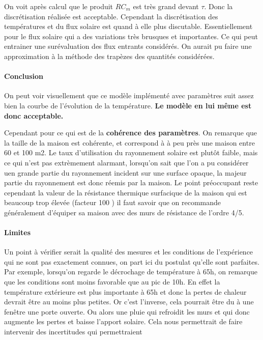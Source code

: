 \documentclass[11pt]{article}
\begin{document}
On voit après calcul que le produit \(RC_m\) est très grand devant
\(\tau\). Donc la discrétisation réalisée est acceptable. Cependant la
discrétisation des températures et du flux solaire est quand à elle plus
discutable. Essentiellement pour le flux solaire qui a des variations
très brusques et importantes. Ce qui peut entrainer une surévaluation
des flux entrants considérés. On aurait pu faire une approximation à la
méthode des trapèzes des quantités considérées.

    \hypertarget{conclusion}{%
\paragraph{Conclusion}\label{conclusion}}

On peut voir visuellement que ce modèle implémenté avec paramètres suit
assez bien la courbe de l'évolution de la température. \textbf{Le modèle
en lui même est donc acceptable.}

Cependant pour ce qui est de la \textbf{cohérence des paramètres}. On
remarque que la taille de la maison est cohérente, et correspond à à peu
près une maison entre 60 et 100 m2. Le taux d'utilisation du rayonnement
solaire est plutôt faible, mais ce qui n'est pas extrèmement alarmant,
lorsqu'on sait que l'on a pu considérer uen grande partie du rayonnement
incident sur une surface opaque, la majeur partie du rayonnement est
donc réemis par la maison. Le point préoccupant reste cependant la
valeur de la résistance thermique surfacique de la maison qui est
beaucoup trop élevée (facteur 100 ) il faut savoir que on recommande
généralement d'équiper sa maison avec des murs de résistance de l'ordre
4/5.

    \hypertarget{limites}{%
\paragraph{Limites}\label{limites}}

Un point à vérifier serait la qualité des mesures et les conditions de
l'expérience qui ne sont pas exactement connues, on part ici du postulat
qu'elle sont parfaites. Par exemple, lorsqu'on regarde le décrochage de
température à 65h, on remarque que les conditions sont moins favorable
que au pic de 10h. En effet la température extérieure est plus
importante à 65h et donc la pertes de chaleur devrait être au moins plus
petites. Or c'est l'inverse, cela pourrait être du à une fenêtre une
porte ouverte. Ou alors une pluie qui refroidit les murs et qui donc
augmente les pertes et baisse l'apport solaire. Cela nous permettrait de
faire intervenir des incertitudes qui permettraient
\end{document}
